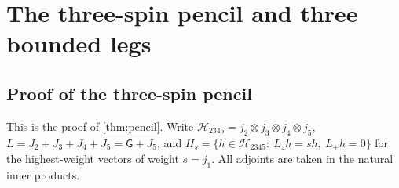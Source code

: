 \section{The three-spin pencil and three bounded legs}\label{app:bounded}

\subsection*{Proof of the three-spin pencil}

This is the proof of \cref{thm:pencil}. Write $\mathcal H_{2345}=j_2\otimes j_3\otimes j_4\otimes j_5$,
$L=J_2+J_3+J_4+J_5=\mathsf G+J_5$, and
$H_s=\{h\in\mathcal H_{2345}:\ L_zh=sh,\ L_+h=0\}$ for the highest-weight vectors of weight
$s=j_1$. All adjoints are taken in the natural inner products.

